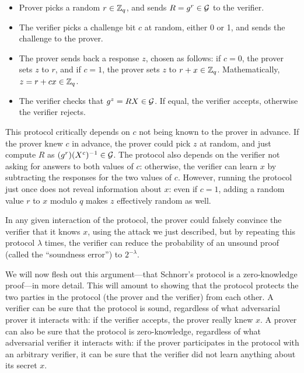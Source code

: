 \begin{itemize}

\item Prover picks a random $r\in \mathbb{Z}_q$, and sends $R=g^r\in \mathcal{G}$ to the verifier.

\item The verifier picks a challenge bit $c$ at random, either 0 or 1,
  and sends the challenge to the prover.

\item The prover sends back a response $z$, chosen as follows: if $c=0$,
  the prover sets $z$ to $r$, and if $c=1$, the prover sets $z$ to $r+x\in \mathbb{Z}_q$.
  Mathematically, $z=r+cx\in \mathbb{Z}_q$.

\item The verifier checks that $g^z=RX\in \mathcal{G}$.  If equal, the verifier accepts,
  otherwise the verifier rejects.

\end{itemize}

This protocol critically depends on $c$ not being known to the prover
in advance.  If the prover knew $c$ in advance, the prover could pick
$z$ at random, and just compute $R$ as $(g^r)(X^c)^{-1}\in \mathcal{G}$.
The protocol also depends on the verifier not asking for answers to
both values of $c$: otherwise, the verifier can learn $x$ by subtracting
the responses for the two values of $c$.  However, running the protocol
just once does not reveal information about $x$: even if $c=1$, adding
a random value $r$ to $x$ modulo $q$ makes $z$ effectively random as well.

In any given interaction of the protocol, the prover could falsely
convince the verifier that it knows $x$, using the attack we just
described, but by repeating this protocol $\lambda$ times, the verifier
can reduce the probability of an unsound proof (called the ``soundness
error'') to $2^{-\lambda}$.

We will now flesh out this argument---that Schnorr's protocol is a
zero-knowledge proof---in more detail.  This will amount to showing that
the protocol protects the two parties in the protocol (the prover and
the verifier) from each other.  A verifier can be sure that the protocol
is sound, regardless of what adversarial prover it interacts with: if
the verifier accepts, the prover really knew $x$.  A prover can also be
sure that the protocol is zero-knowledge, regardless of what adversarial
verifier it interacts with: if the prover participates in the protocol
with an arbitrary verifier, it can be sure that the verifier did not
learn anything about its secret $x$.



